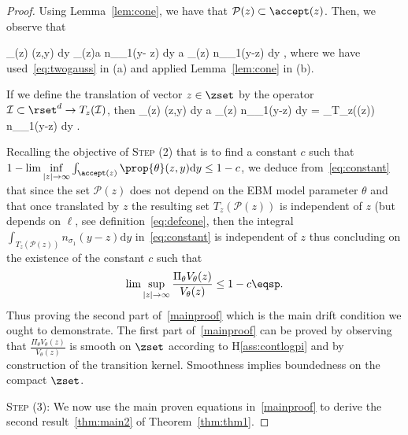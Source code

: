\documentclass{article} %
\begin{document}
\begin{proof}
Using Lemma~\ref{lem:cone}, we have that $\mathcal{P}(z) \subset \accept(z)$.
Then, we observe that  

\beq 
 \int_{\accept(z)} \prop{\theta}(z,y)  \textrm{d}y   \int_{\accept(z)}a n_{\sigma_1}(y- z)  \textrm{d}y  a \int_{(z)}  n_{\sigma_1}(y-z)  \textrm{d}y \eqsp,
 \eeq
where we have used~\eqref{eq:twogauss} in (a) and applied Lemma~\ref{lem:cone} in (b).

If we define the translation of vector $z \in \zset$ by the operator $\mathcal{I} \subset \rset^d \to T_z(\mathcal{I})$, then
\beq\label{eq:constant}
 \int_{\accept(z)} \prop{\theta}(z,y)  \textrm{d}y \geq a \int_{(z)}  n_{\sigma_1}(y-z)  \textrm{d}y =  \int_{T_z((z))}  n_{\sigma_1}(y-z)  \textrm{d}y \eqsp.
\eeq


Recalling the objective of \noindent \textsc{Step (2)} that is to find a constant $c$ such that $1 - \lim \inf \limits_{|z| \to \infty}  \int_{\accept(z)} \prop{\theta}(z,y)  \textrm{d}y \leq 1 - c$, we deduce from~\eqref{eq:constant} that since the set $\mathcal{P}(z)$ does not depend on the EBM model parameter $\theta$ and that once translated by $z$ the resulting set $T_z(\mathcal{P}(z))$ is independent of $z$ (but depends on $\ell$, see definition~\eqref{eq:defcone}, then the integral $ \int_{T_z(\mathcal{P}(z))}  n_{\sigma_1}(y-z)  \textrm{d}y$ in~\eqref{eq:constant} is independent of $z$ thus concluding on the existence of the constant $c$ such that 
$$\lim \sup \limits_{|z| \to \infty}  \frac{\Pi_\theta V_\theta(z)}{V_\theta(z)} \leq 1- c \eqsp.$$ 
Thus proving the second part of~\eqref{mainproof} which is the main drift condition we ought to demonstrate.
The first part of~\eqref{mainproof} can be proved by observing that $  \frac{\Pi_\theta V_\theta(z)}{V_\theta(z)} $ is smooth on $\zset$ according to H\ref{ass:contlogpi} and by construction of the transition kernel. Smoothness implies boundedness on the compact $\zset$.


\medskip
\noindent \textsc{Step (3): } 
We now use the main proven equations in~\eqref{mainproof} to derive the second result~\eqref{thm:main2} of Theorem~\ref{thm:thm1}.


\end{proof}
\end{document}
